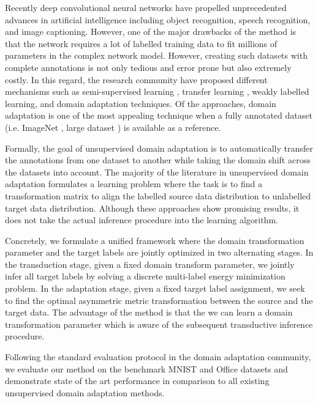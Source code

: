 \documentclass{article}
\begin{document}
Recently deep convolutional neural networks \cite{alexnet, vggnet, googlenet} have propelled unprecedented advances in artificial intelligence including object recognition, speech recognition, and image captioning. However, one of the major drawbacks of the method is that the network requires a lot of labelled training data to fit millions of parameters in the complex network model. However, creating such datasets with complete annotations is not only tedious and error prone but also extremely costly. In this regard, the research community have proposed different mechanisms such as semi-supervised learning \cite{semisup}, transfer learning \cite{transfer}, weakly labelled learning, and domain adaptation techniques. Of the approaches, domain adaptation is one of the most appealing technique when a fully annotated dataset (i.e. ImageNet \cite{ImageNet}, large dataset \cite{largedataset}) is available as a reference. 

Formally, the goal of unsupervised domain adaptation is to automatically transfer the annotations from one dataset to another while taking the domain shift across the datasets into account. The majority of the literature \cite{gong12, baochen15, fernando13, baochen16, tommasi13} in unsupervised domain adaptation formulates a learning problem where the task is to find a transformation matrix to align the labelled source data distribution to unlabelled target data distribution. Although these approaches show promising results, it does not take the actual inference procedure into the learning algorithm.

Concretely, we formulate a unified framework where the domain transformation parameter and the target labels are jointly optimized in two alternating stages. In the transduction stage, given a fixed domain transform parameter, we jointly infer all target labels by solving a discrete multi-label energy minimization problem. In the adaptation stage, given a fixed target label assignment, we seek to find the optimal asymmetric metric transformation between the source and the target data. The advantage of the method is that the we can learn a domain transformation parameter which is aware of the subsequent transductive inference procedure. 

Following the standard evaluation protocol in the domain adaptation community, we evaluate our method on the benchmark MNIST \cite{mnist} and Office \cite{office} datasets and demonstrate state of the art performance in comparison to all existing unsupervised domain adaptation methods.
\end{document}
